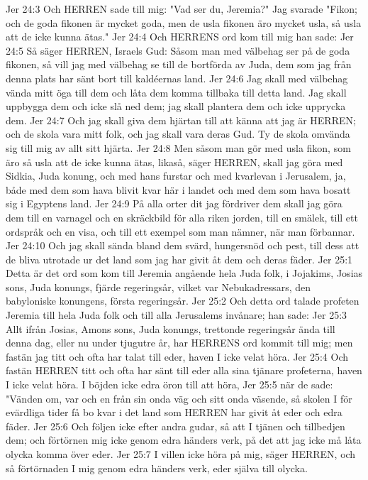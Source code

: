 Jer 24:3  Och HERREN sade till mig: "Vad ser du, Jeremia?" Jag svarade "Fikon; och de goda fikonen är mycket goda, men de usla fikonen äro mycket usla, så usla att de icke kunna ätas."
Jer 24:4  Och HERRENS ord kom till mig han sade:
Jer 24:5  Så säger HERREN, Israels Gud: Såsom man med välbehag ser på de goda fikonen, så vill jag med välbehag se till de bortförda av Juda, dem som jag från denna plats har sänt bort till kaldéernas land.
Jer 24:6  Jag skall med välbehag vända mitt öga till dem och låta dem komma tillbaka till detta land. Jag skall uppbygga dem och icke slå ned dem; jag skall plantera dem och icke upprycka dem.
Jer 24:7  Och jag skall giva dem hjärtan till att känna att jag är HERREN; och de skola vara mitt folk, och jag skall vara deras Gud. Ty de skola omvända sig till mig av allt sitt hjärta.
Jer 24:8  Men såsom man gör med usla fikon, som äro så usla att de icke kunna ätas, likaså, säger HERREN, skall jag göra med Sidkia, Juda konung, och med hans furstar och med kvarlevan i Jerusalem, ja, både med dem som hava blivit kvar här i landet och med dem som hava bosatt sig i Egyptens land.
Jer 24:9  På alla orter dit jag fördriver dem skall jag göra dem till en varnagel och en skräckbild för alla riken jorden, till en smälek, till ett ordspråk och en visa, och till ett exempel som man nämner, när man förbannar.
Jer 24:10  Och jag skall sända bland dem svärd, hungersnöd och pest, till dess att de bliva utrotade ur det land som jag har givit åt dem och deras fäder.
Jer 25:1  Detta är det ord som kom till Jeremia angående hela Juda folk, i Jojakims, Josias sons, Juda konungs, fjärde regeringsår, vilket var Nebukadressars, den babyloniske konungens, första regeringsår.
Jer 25:2  Och detta ord talade profeten Jeremia till hela Juda folk och till alla Jerusalems invånare; han sade:
Jer 25:3  Allt ifrån Josias, Amons sons, Juda konungs, trettonde regeringsår ända till denna dag, eller nu under tjugutre år, har HERRENS ord kommit till mig; men fastän jag titt och ofta har talat till eder, haven I icke velat höra.
Jer 25:4  Och fastän HERREN titt och ofta har sänt till eder alla sina tjänare profeterna, haven I icke velat höra. I böjden icke edra öron till att höra,
Jer 25:5  när de sade: "Vänden om, var och en från sin onda väg och sitt onda väsende, så skolen I för evärdliga tider få bo kvar i det land som HERREN har givit åt eder och edra fäder.
Jer 25:6  Och följen icke efter andra gudar, så att I tjänen och tillbedjen dem; och förtörnen mig icke genom edra händers verk, på det att jag icke må låta olycka komma över eder.
Jer 25:7  I villen icke höra på mig, säger HERREN, och så förtörnaden I mig genom edra händers verk, eder själva till olycka.
